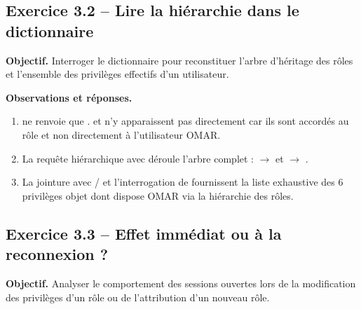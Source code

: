 \subsection{Exercice 3.2 -- Lire la hiérarchie dans le dictionnaire}
\textbf{Objectif.} Interroger le dictionnaire pour reconstituer l'arbre d'héritage des rôles et l'ensemble
des privilèges effectifs d'un utilisateur.


\textbf{Observations et réponses.}
\begin{enumerate}
  \item {} ne renvoie que . 
        et  n'y apparaissent pas directement car ils sont accordés au rôle 
        et non directement à l'utilisateur OMAR.
  \item La requête hiérarchique avec 
        déroule l'arbre complet :  $\to$  et  $\to$
        .
  \item La jointure avec  /  et l'interrogation de
         fournissent la liste exhaustive des 6 privilèges objet dont dispose OMAR
        via la hiérarchie des rôles.
\end{enumerate}

\subsection{Exercice 3.3 -- Effet immédiat ou à la reconnexion ?}
\textbf{Objectif.} Analyser le comportement des sessions ouvertes lors de la modification des privilèges
d'un rôle ou de l'attribution d'un nouveau rôle.



